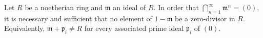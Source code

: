 Let $R$ be a noetherian ring and $\mathfrak{m}$ an ideal of $R$. In order that $\bigcap_{n=1}^{\infty} \mathfrak{m}^n = (0)$, it is necessary and sufficient that no element of $1 - \mathfrak{m}$ be a zero-divisor in $R$. Equivalently, $\mathfrak{m} + \mathfrak{p}_i \neq R$ for every associated prime ideal $\mathfrak{p}_i$ of $(0)$.
